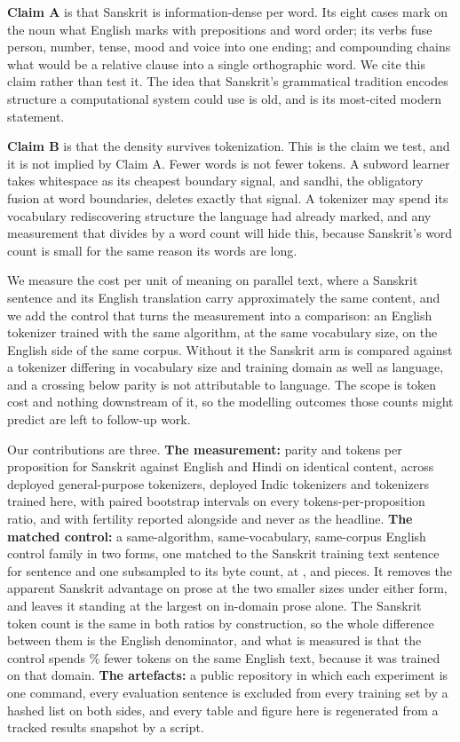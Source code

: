\documentclass[11pt]{article}
\begin{document}
\textbf{Claim A} is that Sanskrit is information-dense per word. Its eight cases mark on
the noun what English marks with prepositions and word order; its verbs fuse person,
number, tense, mood and voice into one ending; and compounding chains what would be a
relative clause into a single orthographic word. We cite this claim rather than test it.
The idea that Sanskrit's grammatical tradition encodes structure a computational system
could use is old, and \citet{briggs-1985-knowledge} is its most-cited modern statement.

\textbf{Claim B} is that the density survives tokenization. This is the claim we test, and
it is not implied by Claim A. Fewer words is not fewer tokens. A subword learner takes
whitespace as its cheapest boundary signal, and sandhi, the obligatory fusion at word
boundaries, deletes exactly that signal. A tokenizer may spend its vocabulary rediscovering
structure the language had already marked, and any measurement that divides by a word
count will hide this, because Sanskrit's word count is small for the same reason its words
are long.

We measure the cost per unit of meaning on parallel text, where a Sanskrit sentence and
its English translation carry approximately the same content, and we add the control that
turns the measurement into a comparison: an English tokenizer trained with the same
algorithm, at the same vocabulary size, on the English side of the same corpus. Without it
the Sanskrit arm is compared against a tokenizer differing in vocabulary size and training
domain as well as language, and a crossing below parity is not attributable to language.
The scope is token cost and nothing downstream of it, so the modelling outcomes those
counts might predict are left to follow-up work.

Our contributions are three. \textbf{The measurement:} parity and tokens per proposition
for Sanskrit against English and Hindi on identical content, across
\numArmsDeployedGeneral{} deployed general-purpose tokenizers, \numArmsDeployedIndic{}
deployed Indic tokenizers and \numTrainedArms{} tokenizers trained here, with paired
bootstrap intervals on every tokens-per-proposition ratio, and with fertility reported
alongside and never as the headline. \textbf{The matched control:} a same-algorithm,
same-vocabulary, same-corpus English control family in two forms, one matched to the
Sanskrit training text sentence for sentence and one subsampled to its byte count, at
\numVocabSmall{}, \numVocabLarge{} and \numVocabHuge{} pieces. It removes the apparent
Sanskrit advantage on prose at the two smaller sizes under either form, and leaves it
standing at the largest on in-domain prose alone. The
Sanskrit token count is the same in both ratios by construction, so the whole difference
between them is the English denominator, and what is measured is that the control spends
\numEnTokenSavingPct\%{} fewer tokens on the same English text, because it was trained on
that domain. \textbf{The artefacts:} a public repository in which each experiment is one
command, every evaluation sentence is excluded from every training set by a hashed list on
both sides, and every table and figure here is regenerated from a tracked results snapshot
by a script.
\end{document}
